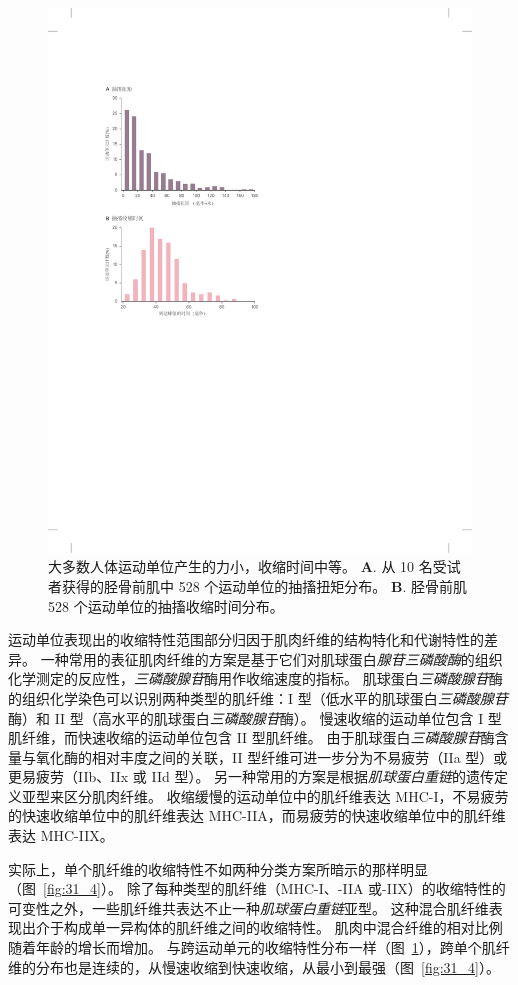 \begin{figure}[htbp]
	\centering
	\includegraphics[width=0.65\linewidth]{chap31/fig_31_3}
	\caption{大多数人体运动单位产生的力小，收缩时间中等\cite{cutsem1997mechanical}。
	\textbf{A}. 从 10 名受试者获得的胫骨前肌中 528 个运动单位的抽搐扭矩分布。
	\textbf{B}. 胫骨前肌 528 个运动单位的抽搐收缩时间分布。}
	\label{fig:31_3}
\end{figure}


运动单位表现出的收缩特性范围部分归因于肌肉纤维的结构特化和代谢特性的差异。
一种常用的表征肌肉纤维的方案是基于它们对肌球蛋白\textit{腺苷三磷酸酶}的组织化学测定的反应性，\textit{三磷酸腺苷}酶用作收缩速度的指标。
肌球蛋白\textit{三磷酸腺苷}酶的组织化学染色可以识别两种类型的肌纤维：I 型（低水平的肌球蛋白\textit{三磷酸腺苷}酶）和 II 型（高水平的肌球蛋白\textit{三磷酸腺苷}酶）。
慢速收缩的运动单位包含 I 型肌纤维，而快速收缩的运动单位包含 II 型肌纤维。
由于肌球蛋白\textit{三磷酸腺苷}酶含量与氧化酶的相对丰度之间的关联，II 型纤维可进一步分为不易疲劳（IIa 型）或更易疲劳（IIb、IIx 或 IId 型）。
另一种常用的方案是根据\textit{肌球蛋白重链}的遗传定义亚型来区分肌肉纤维。
收缩缓慢的运动单位中的肌纤维表达 MHC-I，不易疲劳的快速收缩单位中的肌纤维表达 MHC-IIA，而易疲劳的快速收缩单位中的肌纤维表达 MHC-IIX。


实际上，单个肌纤维的收缩特性不如两种分类方案所暗示的那样明显（图~\ref{fig:31_4}）。
除了每种类型的肌纤维（MHC-I、-IIA 或-IIX）的收缩特性的可变性之外，一些肌纤维共表达不止一种\textit{肌球蛋白重链}亚型。
这种混合肌纤维表现出介于构成单一异构体的肌纤维之间的收缩特性。
肌肉中混合纤维的相对比例随着年龄的增长而增加。
与跨运动单元的收缩特性分布一样（图~\ref{fig:31_3}），跨单个肌纤维的分布也是连续的，从慢速收缩到快速收缩，从最小到最强（图~\ref{fig:31_4}）。


